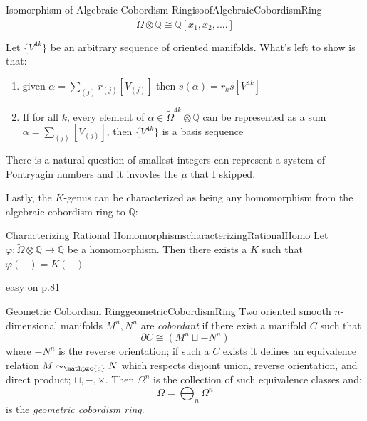 \documentclass{book}
\newcommand{\Q}{{\mathbb{Q}}}
\newcommand{\cc}{{\mathpzc{c}}}
\let\temp\phi
\let\phi\varphi
\let\varphi\temp
\newcommand{\dcup}{\sqcup}
\begin{document}
\begin{thm}{Isomorphism of Algebraic Cobordism Ring}{isoofAlgebraicCobordismRing}
  \[
    \widetilde{\Omega}\otimes \Q \cong \Q[x_1, x_2, ....]
  \]
\end{thm}

\begin{Proof}
  Let $\{V^{4k}\}$ be an arbitrary sequence of oriented manifolds. What's left to show is that:
  \begin{enumerate}
    \item given $\alpha = \sum_{(j)} r_{(j)}[V_{(j)}]$ then $s(\alpha) = r_ks[V^{4k}]$
    \item If for all $k$, every element of $\alpha \in \widetilde{\Omega}^{4k} \otimes \Q$ can be represented
      as a sum $\alpha = \sum_{(j)}[V_{(j)}]$, then $\{V^{4k}\}$ is a basis sequence
  \end{enumerate}
  \cite[p.80]{hirzebruchTopologicalMethodsAlgebraic1995}
\end{Proof}

There is a natural question of smallest integers can represent a system of Pontryagin numbers and it invovles
the $\mu$ that I skipped.

Lastly, the $K$-genus can be characterized as being any homomorphism from the algebraic cobordism ring to
$\Q$:

\begin{thm}{Characterizing Rational Homomorphisms}{characterizingRationalHomo}
  Let $\phi: \widetilde{\Omega}\otimes \Q \to \Q$ be a homomorphism. Then there exists a $K$ such that
  $\phi(-) = K(-)$.
\end{thm}

\begin{Proof}
  easy on p.81
\end{Proof}

\begin{defn}{Geometric Cobordism Ring}{geometricCobordismRing}
  Two oriented smooth $n$-dimensional manifolds $M^n, N^n$ are \emph{cobordant} if there exist a manifold $C$ such that
  \[
    \partial C \cong (M^n \dcup  -N^n)
  \]
  where $-N^n$ is the reverse orientation; if such a $C$ exists it defines an equivalence relation $M\sim_\cc
  N$ which respects disjoint union, reverse orientation, and direct product; $\dcup, -, \times$. Then
  $\Omega^n$ is the collection of such equivalence classes and:
  \[
    \Omega = \bigoplus_n \Omega^n
  \]
  is the \emph{geometric cobordism ring}.
\end{defn}
\end{document}
